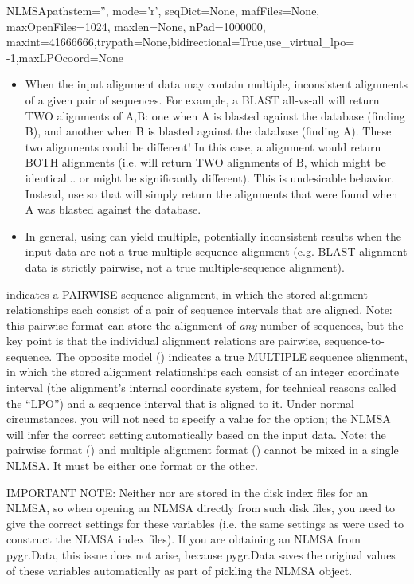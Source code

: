 \documentclass{howto}
\begin{document}
\begin{funcdesc}{NLMSA}{pathstem='', mode='r', seqDict=None, mafFiles=None, maxOpenFiles=1024, maxlen=None, nPad=1000000, maxint=41666666,trypath=None,bidirectional=True,use_virtual_lpo= -1,maxLPOcoord=None}
\begin{itemize}
\item When the input alignment data may contain multiple, inconsistent alignments of
a given pair of sequences.  For example, a BLAST all-vs-all will return TWO alignments
of A,B: one when A is blasted against the database (finding B), and another when 
B is blasted against the database (finding A).  These two alignments could be different!
In this case, a  alignment would return BOTH alignments
(i.e.  will return TWO alignments of B, which might be identical...
or might be significantly different).  This is undesirable behavior.  Instead,
use  so that  will simply return the 
alignments that were found when A was blasted against the database.

\item In general, using  can yield multiple, potentially
inconsistent results when the input data are not a true multiple-sequence alignment
(e.g. BLAST alignment data is strictly pairwise, not a true multiple-sequence alignment).
\end{itemize}

   indicates a PAIRWISE sequence alignment, in which
  the stored alignment relationships each consist of a pair of sequence intervals
  that are aligned.  Note: this pairwise format can store the alignment of {\em any}
  number of sequences, but the key point is that the individual alignment relations
  are pairwise, sequence-to-sequence.  The opposite model ()
  indicates a true MULTIPLE sequence alignment, in which the stored alignment
  relationships each consist of an integer coordinate interval (the alignment's internal
  coordinate system, for technical reasons called the ``LPO'') and a sequence
  interval that is aligned to it.  Under normal circumstances, you will not need
  to specify a value for the  option; the NLMSA will infer
  the correct setting automatically based on the input data.  Note: the pairwise format
  () and multiple alignment format ()
  cannot be mixed in a single NLMSA.  It must be either one format or the other.

  IMPORTANT NOTE: Neither  nor 
  are stored in the disk index files for an NLMSA, so when opening an NLMSA
  directly from such disk files, you need to give the correct settings for these
  variables (i.e. the same settings as were used to construct the NLMSA
  index files).  If you are obtaining an NLMSA from pygr.Data, this issue
  does not arise, because pygr.Data saves the original values of these
  variables automatically as part of pickling the NLMSA object.


\end{funcdesc}
\end{document}
